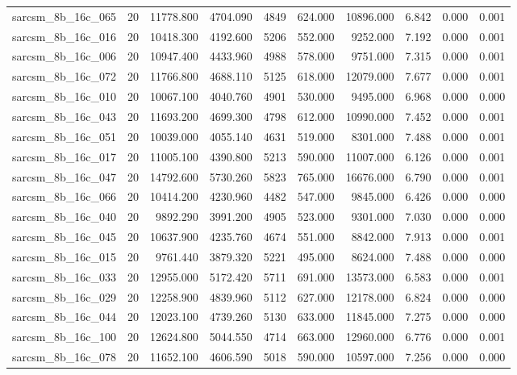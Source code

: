 \begin{tabular}{lrrrrrrrrr}
sarcsm\_8b\_16c\_065 & 20 & 11778.800 & 4704.090 & 4849 & 624.000 & 10896.000 & 6.842 & 0.000 & 0.001 \\
sarcsm\_8b\_16c\_016 & 20 & 10418.300 & 4192.600 & 5206 & 552.000 & 9252.000 & 7.192 & 0.000 & 0.001 \\
sarcsm\_8b\_16c\_006 & 20 & 10947.400 & 4433.960 & 4988 & 578.000 & 9751.000 & 7.315 & 0.000 & 0.001 \\
sarcsm\_8b\_16c\_072 & 20 & 11766.800 & 4688.110 & 5125 & 618.000 & 12079.000 & 7.677 & 0.000 & 0.001 \\
sarcsm\_8b\_16c\_010 & 20 & 10067.100 & 4040.760 & 4901 & 530.000 & 9495.000 & 6.968 & 0.000 & 0.000 \\
sarcsm\_8b\_16c\_043 & 20 & 11693.200 & 4699.300 & 4798 & 612.000 & 10990.000 & 7.452 & 0.000 & 0.001 \\
sarcsm\_8b\_16c\_051 & 20 & 10039.000 & 4055.140 & 4631 & 519.000 & 8301.000 & 7.488 & 0.000 & 0.001 \\
sarcsm\_8b\_16c\_017 & 20 & 11005.100 & 4390.800 & 5213 & 590.000 & 11007.000 & 6.126 & 0.000 & 0.001 \\
sarcsm\_8b\_16c\_047 & 20 & 14792.600 & 5730.260 & 5823 & 765.000 & 16676.000 & 6.790 & 0.000 & 0.001 \\
sarcsm\_8b\_16c\_066 & 20 & 10414.200 & 4230.960 & 4482 & 547.000 & 9845.000 & 6.426 & 0.000 & 0.000 \\
sarcsm\_8b\_16c\_040 & 20 & 9892.290 & 3991.200 & 4905 & 523.000 & 9301.000 & 7.030 & 0.000 & 0.000 \\
sarcsm\_8b\_16c\_045 & 20 & 10637.900 & 4235.760 & 4674 & 551.000 & 8842.000 & 7.913 & 0.000 & 0.001 \\
sarcsm\_8b\_16c\_015 & 20 & 9761.440 & 3879.320 & 5221 & 495.000 & 8624.000 & 7.488 & 0.000 & 0.000 \\
sarcsm\_8b\_16c\_033 & 20 & 12955.000 & 5172.420 & 5711 & 691.000 & 13573.000 & 6.583 & 0.000 & 0.001 \\
sarcsm\_8b\_16c\_029 & 20 & 12258.900 & 4839.960 & 5112 & 627.000 & 12178.000 & 6.824 & 0.000 & 0.000 \\
sarcsm\_8b\_16c\_044 & 20 & 12023.100 & 4739.260 & 5130 & 633.000 & 11845.000 & 7.275 & 0.000 & 0.000 \\
sarcsm\_8b\_16c\_100 & 20 & 12624.800 & 5044.550 & 4714 & 663.000 & 12960.000 & 6.776 & 0.000 & 0.001 \\
sarcsm\_8b\_16c\_078 & 20 & 11652.100 & 4606.590 & 5018 & 590.000 & 10597.000 & 7.256 & 0.000 & 0.000 \\

\end{tabular}
